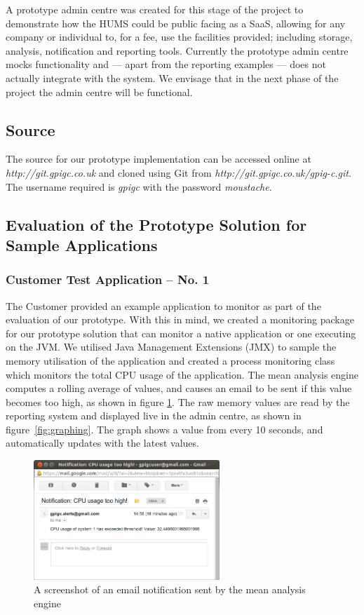 \documentclass[10pt,a4paper]{article}
\begin{document}

A prototype admin centre was created for this stage of the project to demonstrate how the HUMS could be public facing as a SaaS, allowing for any company or individual to, for a fee, use the facilities provided; including storage, analysis, notification and reporting tools. Currently the prototype admin centre mocks functionality and --- apart from the reporting examples --- does not actually integrate with the system. We envisage that in the next phase of the project the admin centre will be functional.

\subsection{Source}
The source for our prototype implementation can be accessed online at \textit{http://git.gpigc.co.uk} and cloned using Git from \textit{http://git.gpigc.co.uk/gpig-c.git}. The username required is \textit{gpigc} with the password \textit{moustache}.

\subsection{Evaluation of the Prototype Solution for Sample Applications}
\label{sec:prototype-evaluation}

\subsubsection{Customer Test Application -- No. 1}
The Customer provided an example application to monitor as part of the
evaluation of our prototype. With this in mind, we created a monitoring 
package for our prototype solution that can monitor a native application
or one executing on the JVM. We utilised Java Management 
Extensions (JMX) to sample the memory utilisation of the application and
created a process monitoring class which monitors the total
CPU usage of the application. The mean analysis engine computes a 
rolling average of values, and causes an email to be sent if this value
becomes too high, as shown in figure \ref{fig:alerting}. The raw memory
values are read by the reporting system and displayed live in the admin
centre, as shown in figure~\ref{fig:graphing}. The graph shows a value from
every 10 seconds, and automatically updates with the latest values.


\begin{figure}[htbp!]
  \centering
  \includegraphics[width=7cm]{images/TestApplicationCPUAlert.png}
  \caption{A screenshot of an email notification sent by the mean analysis engine}
  \label{fig:alerting}
\end{figure}
\end{document}
